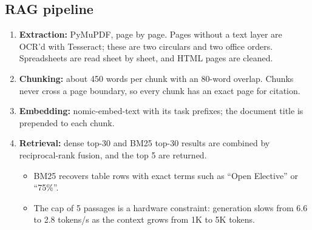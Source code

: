 \documentclass[11pt,a4paper]{article}
\begin{document}
\subsection{RAG pipeline}
\begin{enumerate}
  \item \textbf{Extraction:} PyMuPDF, page by page. Pages without a text layer are OCR'd with Tesseract; these are
        two circulars and two office orders. Spreadsheets are read sheet by sheet, and HTML pages are cleaned.
  \item \textbf{Chunking:} about 450 words per chunk with an 80-word overlap. Chunks never cross a page boundary,
        so every chunk has an exact page for citation.
  \item \textbf{Embedding:} nomic-embed-text with its task prefixes; the document title is prepended to each chunk.
  \item \textbf{Retrieval:} dense top-30 and BM25 top-30 results are combined by reciprocal-rank fusion, and the
        top 5 are returned.
        \begin{itemize}
          \item BM25 recovers table rows with exact terms such as ``Open Elective'' or ``75\%''.
          \item The cap of 5 passages is a hardware constraint: generation slows from 6.6 to 2.8 tokens/s as
                the context grows from 1K to 5K tokens.
        \end{itemize}
\end{enumerate}
\end{document}
